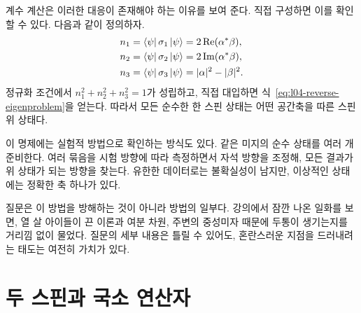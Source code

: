 \begin{classroomqa}
\end{classroomqa}

\begin{classroomqa}
\end{classroomqa}

계수 계산은 이러한 대응이 존재해야 하는 이유를 보여 준다. 직접 구성하면 이를 확인할 수 있다. 다음과 같이 정의하자.
\begin{align}
  n_1&=\left\langle\psi\right\rvert\sigma_1\left\lvert\psi\right\rangle
      =2\operatorname{Re}(\alpha^*\beta),
  \notag\\
  n_2&=\left\langle\psi\right\rvert\sigma_2\left\lvert\psi\right\rangle
      =2\operatorname{Im}(\alpha^*\beta),
  \notag\\
  n_3&=\left\langle\psi\right\rvert\sigma_3\left\lvert\psi\right\rangle
      =|\alpha|^2-|\beta|^2.
  \label{eq:l04-bloch-components}
\end{align}
정규화 조건에서 \(n_1^2+n_2^2+n_3^2=1\)가 성립하고, 직접 대입하면 식~\eqref{eq:l04-reverse-eigenproblem}을 얻는다. 따라서 모든 순수한 한 스핀 상태는 어떤 공간축을 따른 스핀 위 상태다.

이 명제에는 실험적 방법으로 확인하는 방식도 있다. 같은 미지의 순수 상태를 여러 개 준비한다. 여러 묶음을 시험 방향에 따라 측정하면서 자석 방향을 조정해, 모든 결과가 위 상태가 되는 방향을 찾는다. 유한한 데이터로는 불확실성이 남지만, 이상적인 상태에는 정확한 축 하나가 있다.

질문은 이 방법을 방해하는 것이 아니라 방법의 일부다. 강의에서 잠깐 나온 일화를 보면, 열 살 아이들이 끈 이론과 여분 차원, 주변의 중성미자 때문에 두통이 생기는지를 거리낌 없이 물었다. 질문의 세부 내용은 틀릴 수 있어도, 혼란스러운 지점을 드러내려는 태도는 여전히 가치가 있다.

\section{두 스핀과 국소 연산자}

